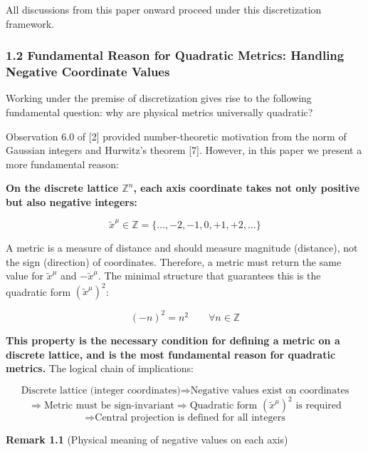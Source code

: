 \documentclass[a4paper,11pt]{article}
\theoremstyle{definition}
\begin{document}
All discussions from this paper onward proceed under this discretization framework.

\subsubsection{1.2 Fundamental Reason for Quadratic Metrics: Handling Negative Coordinate Values}\label{fundamental-reason-for-quadratic-metrics-handling-negative-coordinate-values}

Working under the premise of discretization gives rise to the following fundamental question: why are physical metrics universally quadratic?

Observation 6.0 of {[}2{]} provided number-theoretic motivation from the norm of Gaussian integers and Hurwitz's theorem {[}7{]}. However, in this paper we present a more fundamental reason:

\textbf{On the discrete lattice \(\mathbb{Z}^n\), each axis coordinate takes not only positive but also negative integers:}

\[\tilde{x}^\mu \in \mathbb{Z} = \{\ldots, -2, -1, 0, +1, +2, \ldots\}\]

A metric is a measure of distance and should measure magnitude (distance), not the sign (direction) of coordinates. Therefore, a metric must return the same value for \(\tilde{x}^\mu\) and \(-\tilde{x}^\mu\). The minimal structure that guarantees this is the quadratic form \((\tilde{x}^\mu)^2\):

\[(-n)^2 = n^2 \qquad \forall n \in \mathbb{Z} \tag{1.1}\]

\textbf{This property is the necessary condition for defining a metric on a discrete lattice, and is the most fundamental reason for quadratic metrics.} The logical chain of implications:

\[\text{Discrete lattice (integer coordinates)} \Longrightarrow \text{Negative values exist on coordinates}\] \[\Longrightarrow \text{Metric must be sign-invariant} \Longrightarrow \text{Quadratic form } (\tilde{x}^\mu)^2 \text{ is required}\] \[\Longrightarrow \text{Central projection is defined for all integers}\]

\textbf{Remark 1.1} (Physical meaning of negative values on each axis)
\end{document}
